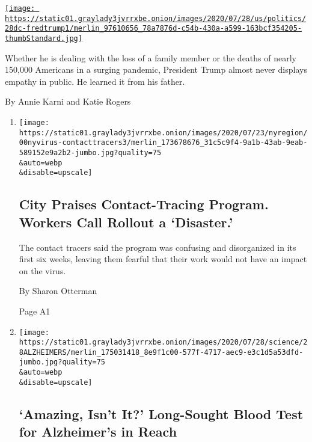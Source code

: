 \begin{enumerate}
\begin{enumerate}
    \href{/2020/07/28/us/politics/donald-fred-trump.html}{\texttt{[image: https://static01.graylady3jvrrxbe.onion/images/2020/07/28/us/politics/28dc-fredtrump1/merlin\_97610656\_78a7876d-c54b-430a-a599-163bcf354205-thumbStandard.jpg]}}

    Whether he is dealing with the loss of a family member or the deaths
    of nearly 150,000 Americans in a surging pandemic, President Trump
    almost never displays empathy in public. He learned it from his
    father.

    By Annie Karni and Katie Rogers
  \end{enumerate}
\end{enumerate}

\begin{enumerate}
\def\labelenumi{\arabic{enumi}.}
\item
  \href{/2020/07/29/nyregion/new-york-contact-tracing.html}{}

  \texttt{[image: https://static01.graylady3jvrrxbe.onion/images/2020/07/23/nyregion/00nyvirus-contacttracers3/merlin\_173678676\_31c5c9f4-9a1b-43ab-9eab-589152e9a2b2-jumbo.jpg?quality=75\\\&auto=webp\\\&disable=upscale]}

  \hypertarget{city-praises-contact-tracing-program-workers-call-rollout-a-disaster}{%
  \subsection{City Praises Contact-Tracing Program. Workers Call Rollout
  a
  `Disaster.'}\label{city-praises-contact-tracing-program-workers-call-rollout-a-disaster}}

  The contact tracers said the program was confusing and disorganized in
  its first six weeks, leaving them fearful that their work would not
  have an impact on the virus.

  By Sharon Otterman

  Page A1
\item
  \href{/2020/07/28/health/alzheimers-blood-test.html}{}

  \texttt{[image: https://static01.graylady3jvrrxbe.onion/images/2020/07/28/science/28ALZHEIMERS/merlin\_175031418\_8e9f1c00-577f-4717-aec9-e3c1d5a53dfd-jumbo.jpg?quality=75\\\&auto=webp\\\&disable=upscale]}

  \hypertarget{amazing-isnt-it-long-sought-blood-test-for-alzheimers-in-reach}{%
  \subsection{`Amazing, Isn't It?' Long-Sought Blood Test for
  Alzheimer's in
  Reach}\label{amazing-isnt-it-long-sought-blood-test-for-alzheimers-in-reach}}


\end{enumerate}
